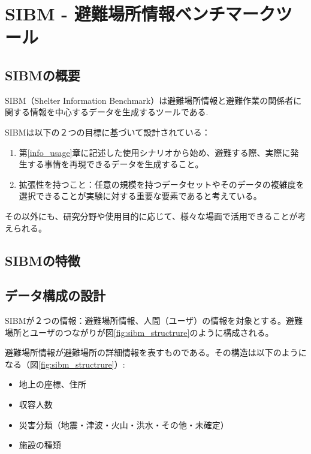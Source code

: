 ﻿%
\chapter{SIBM - 避難場所情報ベンチマークツール}
\label{sibm_exp}

\section{SIBMの概要}
\label{sibm:definition}

SIBM（Shelter Information Benchmark）は避難場所情報と避難作業の関係者に関する情報を中心するデータを生成するツールである.

SIBMは以下の２つの目標に基づいて設計されている：

\begin{enumerate}
  \item
  第\ref{info_usage}章に記述した使用シナリオから始め、避難する際、実際に発生する事情を再現できるデータを生成すること。
  \item 拡張性を持つこと：任意の規模を持つデータセットやそのデータの複雑度を選択できることが実験に対する重要な要素であると考えている。
\end{enumerate}

その以外にも、研究分野や使用目的に応じて、様々な場面で活用できることが考えられる。

\section{SIBMの特徴}
\label{sibm:definition}

\section{データ構成の設計}
\label{sibm:data_structure}

SIBMが２つの情報：避難場所情報、人間（ユーザ）の情報を対象とする。避難場所とユーザのつながりが図\ref{fig:sibm_structrure}のように構成される。

避難場所情報が避難場所の詳細情報を表すものである。その構造は以下のようになる（図\ref{fig:sibm_structrure}）:

\begin{itemize}
  \item 地上の座標、住所
  \item 収容人数
  \item 災害分類（地震・津波・火山・洪水・その他・未確定）
  \item 施設の種類
\end{itemize}

